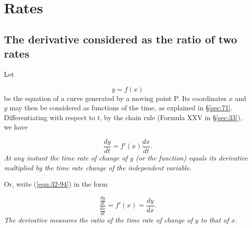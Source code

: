 
\chapter{Rates}


\section{The derivative considered as the ratio of two rates}

Let

\[
    y = f(x)
\]
be the equation of a curve generated by a moving point P. 
Its coordinates $x$ and $y$ may then be considered as functions 
of the time, as explained in \S \ref{sec:71}. %
Differentiating with respect to $t$, by the chain rule 
(Formula XXV in \S \ref{sec:33}), we have

\begin{equation}
\frac{dy}{dt} = f'(x) \frac{dx}{dt}.
\label{eqn:32-94}
\end{equation}
{\it At any instant the time rate of change of $y$ (or the function) 
equals its derivative multiplied by the time rate change of the 
independent variable.}

Or, write (\ref{eqn:32-94}) in the form

\[
\frac{\frac{dy}{dt}}{\frac{dx}{dt}} = f'(x) = \frac{dy}{dx}.
\]
{\it The derivative measures the ratio of the time rate of 
change of $y$ to that of $x$.}

